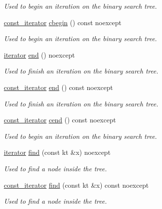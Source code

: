 \begin{DoxyCompactItemize}
\begin{DoxyCompactList}\small\item\em Used to begin an iteration on the binary search tree. \end{DoxyCompactList}\item 
\hyperlink{classbst_a72485696d999bf489c6156f6327a2163}{const\+\_\+iterator} \hyperlink{classbst_a74e78aa7f879a5df0b933651174de42b}{cbegin} () const noexcept
\begin{DoxyCompactList}\small\item\em Used to begin an iteration on the binary search tree. \end{DoxyCompactList}\item 
\hyperlink{classbst_a429b0445783ff6486882db5dee900ce0}{iterator} \hyperlink{classbst_aed3a831efc810b5084cb0c9f4adeb16a}{end} () noexcept
\begin{DoxyCompactList}\small\item\em Used to finish an iteration on the binary search tree. \end{DoxyCompactList}\item 
\hyperlink{classbst_a72485696d999bf489c6156f6327a2163}{const\+\_\+iterator} \hyperlink{classbst_aa9fa40cf0781035f180aa56d15f0e2d1}{end} () const noexcept
\begin{DoxyCompactList}\small\item\em Used to finish an iteration on the binary search tree. \end{DoxyCompactList}\item 
\hyperlink{classbst_a72485696d999bf489c6156f6327a2163}{const\+\_\+iterator} \hyperlink{classbst_a2f78931b69f0a121823b60393f1b9745}{cend} () const noexcept
\begin{DoxyCompactList}\small\item\em Used to begin an iteration on the binary search tree. \end{DoxyCompactList}\item 
\hyperlink{classbst_a429b0445783ff6486882db5dee900ce0}{iterator} \hyperlink{classbst_a6c2bdb4e40b2a6871840af57f42765f8}{find} (const kt \&x) noexcept
\begin{DoxyCompactList}\small\item\em Used to find a node inside the tree. \end{DoxyCompactList}\item 
\hyperlink{classbst_a72485696d999bf489c6156f6327a2163}{const\+\_\+iterator} \hyperlink{classbst_a2971e3ad8b28cf5bdf08128eee48d26d}{find} (const kt \&x) const noexcept
\begin{DoxyCompactList}\small\item\em Used to find a node inside the tree. \end{DoxyCompactList}\item 

\end{DoxyCompactItemize}
